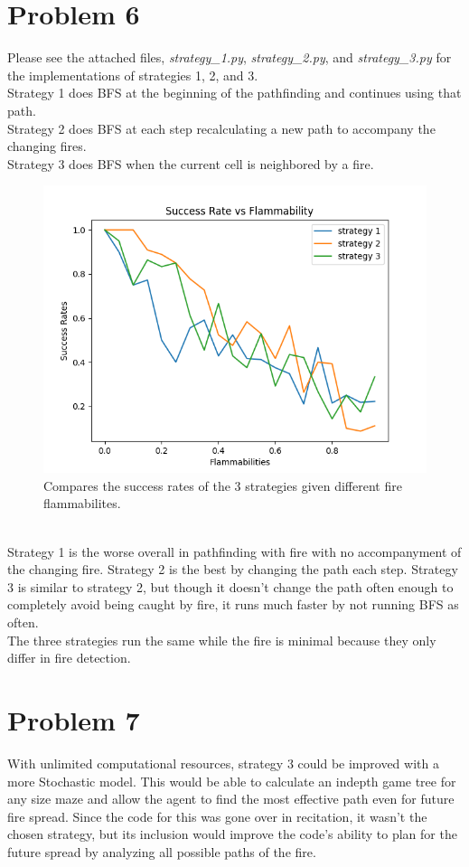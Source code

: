 \documentclass[12pt]{report}
\begin{document}
\section{Problem 6}
Please see the attached files, \emph{strategy\_1.py}, \emph{strategy\_2.py}, and \emph{strategy\_3.py} for the implementations of strategies 1, 2, and 3.\\
Strategy 1 does BFS at the beginning of the pathfinding and continues using that path.\\
Strategy 2 does BFS at each step recalculating a new path to accompany the changing fires.\\
Strategy 3 does BFS when the current cell is neighbored by a fire.
\begin{figure}[h]
\includegraphics[width=\textwidth]{Success Rate vs Flammability.png}
\caption{Compares the success rates of the 3 strategies given different fire flammabilites.}
\label{Success Rate vs Flammability}
\end{figure}\\
Strategy 1 is the worse overall in pathfinding with fire with no accompanyment of the changing fire. Strategy 2 is the best by changing the path each step. Strategy 3 is similar to strategy 2, but though it doesn't change the path often enough to completely avoid being caught by fire, it runs much faster by not running BFS as often.\\
The three strategies run the same while the fire is minimal because they only differ in fire detection.

\section{Problem 7}
With unlimited computational resources, strategy 3 could be improved with a more Stochastic model. This would be able to calculate an indepth game tree for any size maze and allow the agent to find the most effective path even for future fire spread. Since the code for this was gone over in recitation, it wasn't the chosen strategy, but its inclusion would improve the code's ability to plan for the future spread by analyzing all possible paths of the fire.
\end{document}
